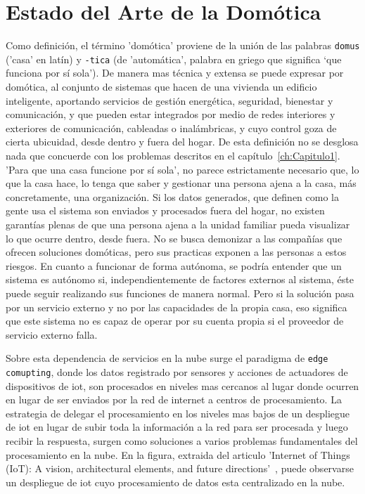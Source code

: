 \cleardoublepage

\chapter{Estado del Arte de la Domótica}
\label{ch:Capitulo2}

Como definición, el término 'domótica' proviene de la unión de las palabras \verb|domus| ('casa' en latín) y \verb|-tica| (de 'automática', palabra en griego que significa ‘que funciona por sí sola’). De manera mas técnica y extensa se puede expresar por domótica, al conjunto de sistemas que hacen de una vivienda un edificio inteligente, aportando servicios de gestión energética, seguridad, bienestar y comunicación, y que pueden estar integrados por medio de redes interiores y exteriores de comunicación, cableadas o inalámbricas, y cuyo control goza de cierta ubicuidad, desde dentro y fuera del hogar. De esta definición no se desglosa nada que concuerde con los problemas descritos en el capítulo~\ref{ch:Capitulo1}. 'Para que una casa funcione por sí sola', no parece estrictamente necesario que, lo que la casa hace, lo tenga que saber y gestionar una persona ajena a la casa, más concretamente, una organización. Si los datos generados, que definen como la gente usa el sistema son enviados y procesados fuera del hogar, no existen garantías plenas de que una persona ajena a la unidad familiar pueda visualizar lo que ocurre dentro, desde fuera. No se busca demonizar a las compañías que ofrecen soluciones domóticas, pero sus practicas exponen a las personas a estos riesgos. En cuanto a funcionar de forma autónoma, se podría entender que un sistema es autónomo si, independientemente de factores externos al sistema, éste puede seguir realizando sus funciones de manera normal. Pero si la solución pasa por un servicio externo y no por las capacidades de la propia casa, eso significa que este sistema no es capaz de operar por su cuenta propia si el proveedor de servicio externo falla.

\vspace{1cm}

Sobre esta dependencia de servicios en la nube surge el paradigma de \verb|edge comupting|, donde los datos registrado por sensores y acciones de actuadores de dispositivos de \gls{iot}, son procesados en niveles mas cercanos al lugar donde ocurren en lugar de ser enviados por la red de internet a centros de procesamiento. La estrategia de delegar el procesamiento en los niveles mas bajos de un despliegue de \gls{iot} en lugar de subir toda la información a la red para ser procesada y luego recibir la respuesta, surgen como soluciones a varios problemas fundamentales del procesamiento en la nube. En la figura, extraida del articulo 'Internet of Things (IoT): A vision, architectural elements, and future directions'~\cite{gubbi2013internet}, puede observarse un despliegue de \gls{iot} cuyo procesamiento de datos esta centralizado en la nube.

